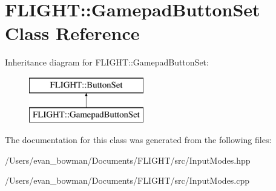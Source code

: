 \hypertarget{class_f_l_i_g_h_t_1_1_gamepad_button_set}{}\section{F\+L\+I\+G\+HT\+:\+:Gamepad\+Button\+Set Class Reference}
\label{class_f_l_i_g_h_t_1_1_gamepad_button_set}
Inheritance diagram for F\+L\+I\+G\+HT\+:\+:Gamepad\+Button\+Set\+:\begin{figure}[H]
\begin{center}
\leavevmode
\includegraphics[height=2.000000cm]{class_f_l_i_g_h_t_1_1_gamepad_button_set}
\end{center}
\end{figure}


The documentation for this class was generated from the following files\+:\begin{DoxyCompactItemize}
\item 
/\+Users/evan\+\_\+bowman/\+Documents/\+F\+L\+I\+G\+H\+T/src/Input\+Modes.\+hpp\item 
/\+Users/evan\+\_\+bowman/\+Documents/\+F\+L\+I\+G\+H\+T/src/Input\+Modes.\+cpp\end{DoxyCompactItemize}
